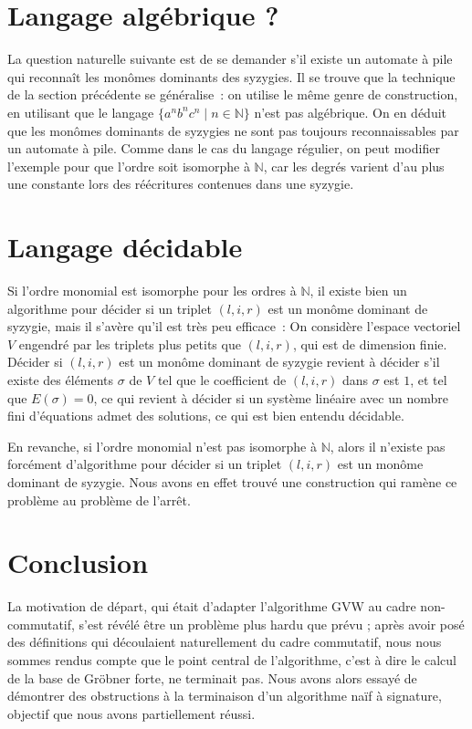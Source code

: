 \documentclass{article}
\newcommand{\N}{\mathbb{N}}
\begin{document}
\section*{Langage algébrique ?}

La question naturelle suivante est de se demander s'il existe un automate à pile qui reconnaît les monômes dominants des syzygies.
Il se trouve que la technique de la section précédente se généralise~: on utilise le même genre de construction, en utilisant que le langage $\{a^nb^nc^n \;|\; n \in \N\}$ n'est pas algébrique.
On en déduit que les monômes dominants de syzygies ne sont pas toujours reconnaissables par un automate à pile. Comme dans le cas du langage régulier, on peut modifier l'exemple pour que l'ordre soit isomorphe à $\N$, car les degrés varient d'au plus une constante lors des réécritures contenues dans une syzygie.

\section*{Langage décidable}

Si l'ordre monomial est isomorphe pour les ordres à $\N$, il existe bien un algorithme pour décider si un triplet $(l, i, r)$ est un monôme dominant de syzygie, mais il s'avère qu'il est très peu efficace~:
On considère l'espace vectoriel $V$ engendré par les triplets plus petits que $(l, i, r)$, qui est de dimension finie.
Décider si $(l, i, r)$ est un monôme dominant de syzygie revient à décider s'il existe des éléments $\sigma$ de $V$ tel que le coefficient de $(l, i, r)$ dans $\sigma$ est $1$, et tel que $E(\sigma) = 0$, ce qui revient à décider si un système linéaire avec un nombre fini d'équations admet des solutions, ce qui est bien entendu décidable.

En revanche, si l'ordre monomial n'est pas isomorphe à $\N$, alors il n'existe pas forcément d'algorithme pour décider si un triplet $(l, i, r)$ est un monôme dominant de syzygie. Nous avons en effet trouvé une construction qui ramène ce problème au problème de l'arrêt.

\section*{Conclusion}

La motivation de départ, qui était d'adapter l'algorithme GVW au cadre non-commutatif, s'est révélé être un problème plus hardu que prévu ; après avoir posé des définitions qui découlaient naturellement du cadre commutatif, nous nous sommes rendus compte que le point central de l'algorithme, c'est à dire le calcul de la base de Gröbner forte, ne terminait pas. Nous avons alors essayé de démontrer des obstructions à la terminaison d'un algorithme naïf à signature, objectif que nous avons partiellement réussi.

\nocite{*}
\printbibliography
\end{document}
